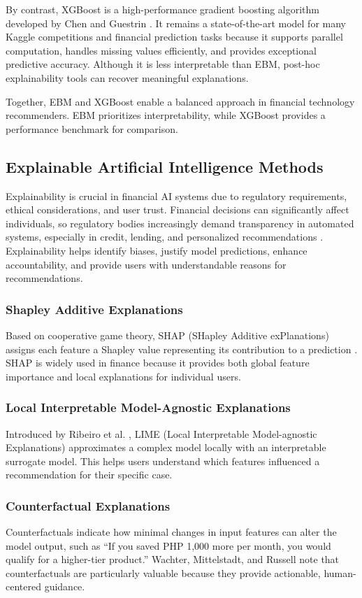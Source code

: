 \documentclass{icsthesis}
\begin{document}
\begin{mainmatter}
                By contrast, XGBoost is a high-performance gradient boosting algorithm developed by Chen and Guestrin \cite{ref16}. It remains a state-of-the-art model for many Kaggle competitions and financial prediction tasks because it supports parallel computation, handles missing values efficiently, and provides exceptional predictive accuracy. Although it is less interpretable than EBM, post-hoc explainability tools can recover meaningful explanations.

                Together, EBM and XGBoost enable a balanced approach in financial technology recommenders. EBM prioritizes interpretability, while XGBoost provides a performance benchmark for comparison.

			\subsection{Explainable Artificial Intelligence Methods}
				Explainability is crucial in financial AI systems due to regulatory requirements, ethical considerations, and user trust. Financial decisions can significantly affect individuals, so regulatory bodies increasingly demand transparency in automated systems, especially in credit, lending, and personalized recommendations \cite{ref17}. Explainability helps identify biases, justify model predictions, enhance accountability, and provide users with understandable reasons for recommendations.

				\subsubsection{Shapley Additive Explanations}
					Based on cooperative game theory, SHAP (SHapley Additive exPlanations) assigns each feature a Shapley value representing its contribution to a prediction \cite{ref18}. SHAP is widely used in finance because it provides both global feature importance and local explanations for individual users.

				\subsubsection{Local Interpretable Model-Agnostic Explanations}
					Introduced by Ribeiro et al. \cite{ref19}, LIME (Local Interpretable Model-agnostic Explanations) approximates a complex model locally with an interpretable surrogate model. This helps users understand which features influenced a recommendation for their specific case.

				\subsubsection{Counterfactual Explanations}
					Counterfactuals indicate how minimal changes in input features can alter the model output, such as ``If you saved PHP 1,000 more per month, you would qualify for a higher-tier product.'' Wachter, Mittelstadt, and Russell \cite{ref20} note that counterfactuals are particularly valuable because they provide actionable, human-centered guidance.


\end{mainmatter}
\end{document}
